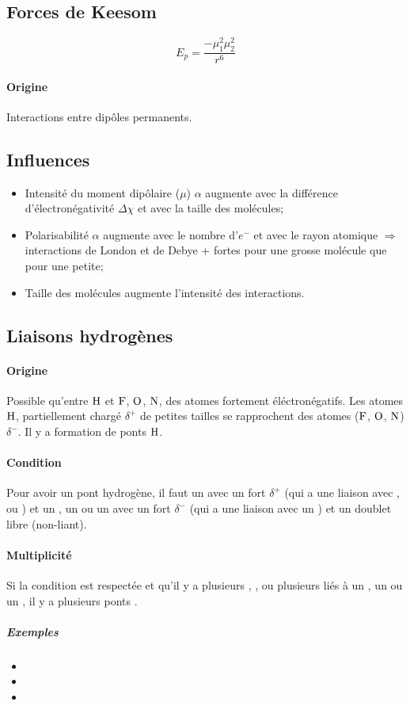 \subsection{Forces de Keesom}
\[ E_p = \frac{-\mu_1^2 \mu_2^2}{r^6} \]

\paragraph{Origine}
Interactions entre dipôles permanents.

\subsection{Influences}

\begin{itemize}
	\item Intensité du moment dipôlaire ($\mu$)
		$\alpha$ augmente avec la différence d'électronégativité $\Delta\chi$ et avec la taille des molécules;
	\item Polarisabilité
		$\alpha$ augmente avec le nombre d'$e^-$ et avec le rayon atomique
		$\Rightarrow$ interactions de London et de Debye + fortes pour une grosse molécule que pour une petite;
	\item Taille des molécules augmente l'intensité des interactions.
\end{itemize}

\subsection{Liaisons hydrogènes}
\paragraph{Origine}
Possible qu'entre $\ce{H}$ et $\ce{F}$, $\ce{O}$, $\ce{N}$, des atomes fortement éléctronégatifs.
Les atomes $\ce{H}$, partiellement chargé $\delta^+$ de petites tailles se rapprochent des atomes ($\ce{F}$, $\ce{O}$, $\ce{N}$) $\delta^-$.
Il y a formation de ponts $\ce{H}$.
\paragraph{Condition}
Pour avoir un pont hydrogène, il faut un  avec un fort $\delta^+$ (qui a une liaison avec ,  ou ) et un , un  ou un  avec un fort $\delta^-$ (qui a une liaison avec un ) et un doublet libre (non-liant).
\paragraph{Multiplicité}
Si la condition est respectée et qu'il y a plusieurs , ,  ou plusieurs  liés à un , un  ou un , il y a plusieurs ponts .
\subparagraph{Exemples}
\begin{itemize}
	\item {}
	\item {}
	\item {}
\end{itemize}

